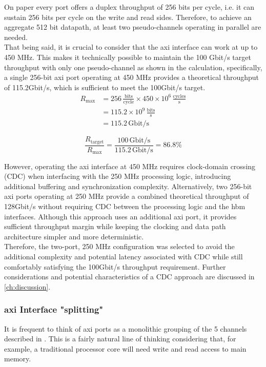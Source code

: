 On paper every port offers a duplex throughput of 256 bits per cycle, i.e. it can sustain 256 bits per cycle on
the write and read sides. Therefore, to achieve an aggregate 512 bit datapath, at least two pseudo-channels operating in parallel are needed.\\

That being said, it is crucial to consider that the \gls{axi} interface can work at up to 450 MHz. This makes it technically possible to maintain 
the 100 Gbit/s target throughput with only one pseudo-channel as shown in the calculation, specifically, a single 256-bit \gls{axi} port operating at 450 MHz 
provides a theoretical throughput of 115.2Gbit/s, which is sufficient to meet the 100Gbit/s target. \\

\[
\begin{aligned}
R_{\mathrm{max}}
&= 256\,\frac{\mathrm{bits}}{\mathrm{cycle}}
\times 450\times10^6\,\frac{\mathrm{cycles}}{\mathrm{s}} \\[4pt]
&= 115.2\times10^9\,\frac{\mathrm{bits}}{\mathrm{s}} \\[4pt]
&= \boxed{115.2\,\mathrm{Gbit/s}}
\end{aligned}
\]

\[
\frac{R_{\mathrm{target}}}{R_{\mathrm{max}}}
=
\frac{100\,\mathrm{Gbit/s}}{115.2\,\mathrm{Gbit/s}}
=
\boxed{86.8\%}
\]

However, operating the \gls{axi} interface at 450 MHz requires clock-domain crossing (CDC) when interfacing with the 250 MHz processing logic, introducing 
additional buffering and synchronization complexity. Alternatively, two 256-bit \gls{axi} ports operating at 250 MHz provide a combined 
theoretical throughput of 128Gbit/s without requiring CDC between the processing logic and the \gls{hbm} interfaces. Although this approach 
uses an additional \gls{axi} port, it provides sufficient throughput margin while keeping the clocking and data path architecture simpler and 
more deterministic.\\

Therefore, the two-port, 250 MHz configuration was selected to avoid the additional complexity and potential latency 
associated with CDC while still comfortably satisfying the 100Gbit/s throughput requirement. Further considerations and potential characteristics
of a CDC approach are discussed in \ref{ch:discussion}.

\subsubsection{\gls{axi} Interface "splitting"}
It is frequent to think of \gls{axi} ports as a monolithic grouping of the 5 channels described in \cite{arm_axi_channel_signals}.
This is a fairly natural line of thinking considering that, for example, a traditional processor core will need write and
read access to main memory.\\

